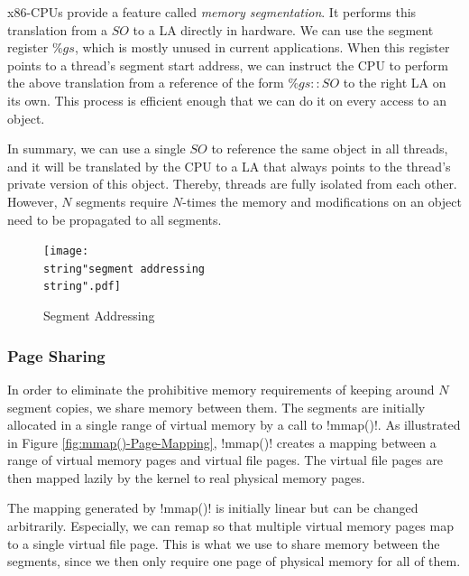 \documentclass{sigplanconf}
\makeatletter
\renewcommand\lstinline[1][]{%
  \Collectverb{\@@myverb}%
}
\def\@@myverb#1{%
    \begingroup
    \fboxsep=0.2em
    \colorbox{verylightgray}{\oldlstinline|#1|}%
    \endgroup
}
\makeatother
\begin{document}
x86-CPUs provide a feature called \emph{memory segmentation}. It
performs this translation from a $SO$ to a LA directly in hardware.  We
can use the segment register $\%gs$, which is mostly unused in current
applications. When this register points to a thread's segment start
address, we can instruct the CPU to perform the above translation from
a reference of the form $\%gs{::}SO$ to the right LA on its own. This
process is efficient enough that we can do it on every access to an
object.

In summary, we can use a single $SO$ to reference the same object in all
threads, and it will be translated by the CPU to a LA that always
points to the thread's private version of this object. Thereby,
threads are fully isolated from each other. However, $N$ segments
require $N$-times the memory and modifications on an object need to be
propagated to all segments.

\begin{figure}[t]
  \begin{centering}
    \texttt{[image: \\string"segment addressing\\string".pdf]}
    \par\end{centering}

    \protect\caption{Segment Addressing\label{fig:Segment-Addressing}}
\end{figure}



\subsubsection{Page Sharing}

In order to eliminate the prohibitive memory requirements of keeping
around $N$ segment copies, we share memory between them. The segments
are initially allocated in a single range of virtual memory by a call
to \lstinline!mmap()!.  As illustrated in Figure
\ref{fig:mmap()-Page-Mapping}, \lstinline!mmap()! creates a mapping
between a range of virtual memory pages and virtual file pages. The
virtual file pages are then mapped lazily by the kernel to real
physical memory pages.

The mapping generated by \lstinline!mmap()! is initially linear but
can be changed arbitrarily. Especially, we can remap so that multiple
virtual memory pages map to a single virtual file page. This is what
we use to share memory between the segments, since we then only
require one page of physical memory for all of them.
\end{document}
